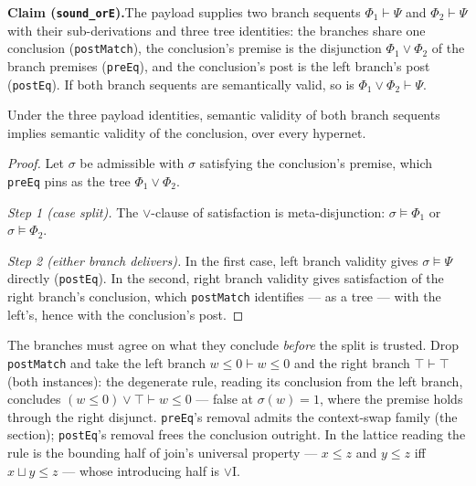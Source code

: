 

\textbf{Claim (\texttt{sound\_orE}).}\enspace The payload supplies two
branch sequents $\Phi_1 \vdash \Psi$ and $\Phi_2 \vdash \Psi$ with their
sub-derivations and three tree identities: the branches share one
conclusion (\texttt{postMatch}), the conclusion's premise is the
disjunction $\Phi_1 \vee \Phi_2$ of the branch premises (\texttt{preEq}),
and the conclusion's post is the left branch's post (\texttt{postEq}).
If both branch sequents are semantically valid, so is
$\Phi_1 \vee \Phi_2 \vdash \Psi$.

\begin{bthm}\label{thm:ore-sound}
Under the three payload identities, semantic validity of both branch
sequents implies semantic validity of the conclusion, over every
hypernet.
\end{bthm}
\begin{proof}
Let $\sigma$ be admissible with $\sigma$ satisfying the conclusion's
premise, which \texttt{preEq} pins as the tree $\Phi_1 \vee \Phi_2$.

\emph{Step 1 (case split).} The $\vee$-clause of satisfaction is
meta-disjunction: $\sigma \models \Phi_1$ or $\sigma \models \Phi_2$.

\emph{Step 2 (either branch delivers).} In the first case, left branch
validity gives $\sigma \models \Psi$ directly (\texttt{postEq}). In the
second, right branch validity gives satisfaction of the right branch's
conclusion, which \texttt{postMatch} identifies --- as a tree --- with
the left's, hence with the conclusion's post.
\end{proof}

\begin{bremark}\label{rem:ore-post}
The branches must agree on what they conclude \emph{before} the split is
trusted. Drop \texttt{postMatch} and take the left branch
$w \leq 0 \vdash w \leq 0$ and the right branch $\top \vdash \top$ (both
 instances): the degenerate rule, reading its conclusion
from the left branch, concludes $(w \leq 0) \vee \top \vdash w \leq 0$
--- false at $\sigma(w) = 1$, where the premise holds through the right
disjunct. \texttt{preEq}'s removal admits the context-swap family (the
 section); \texttt{postEq}'s removal frees the
conclusion outright. In the lattice reading the rule is the bounding
half of join's universal property --- $x \leq z$ and $y \leq z$ iff
$x \sqcup y \leq z$ --- whose introducing half is $\vee$I.
\end{bremark}

